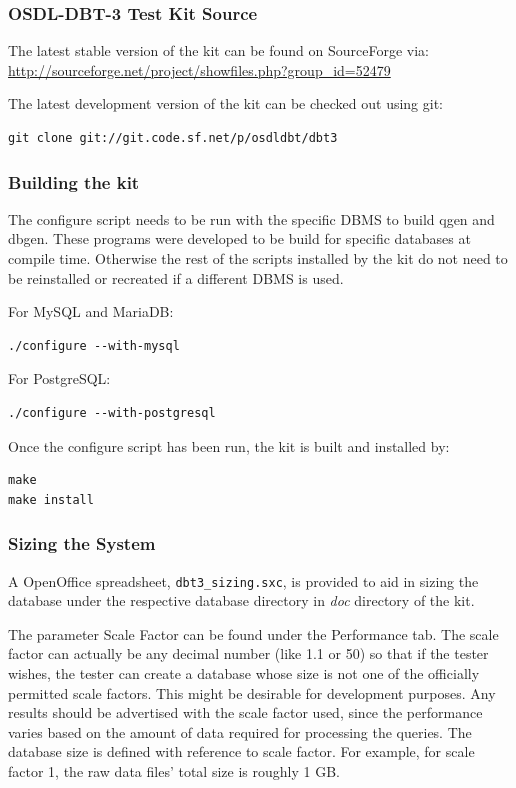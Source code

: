 \documentclass{article}
\begin{document}
\subsubsection{OSDL-DBT-3 Test Kit Source}

The latest stable version of the kit can be found on SourceForge
via: \url{http://sourceforge.net/project/showfiles.php?group\_id=52479}

The latest development version of the kit can be checked out using git:
\lstset{language=sh}
\begin{lstlisting}
git clone git://git.code.sf.net/p/osdldbt/dbt3
\end{lstlisting}

\subsubsection{Building the kit}

The configure script needs to be run with the specific DBMS to build qgen and dbgen.  These programs were developed to be build for specific databases at compile time.  Otherwise the rest of the scripts installed by the kit do not need to be reinstalled or recreated if a different DBMS is used.

For MySQL and MariaDB:
\lstset{language=sh}
\begin{lstlisting}
./configure --with-mysql
\end{lstlisting}

For PostgreSQL:
\lstset{language=sh}
\begin{lstlisting}
./configure --with-postgresql
\end{lstlisting}

Once the configure script has been run, the kit is built and installed by:
\begin{lstlisting}
make
make install
\end{lstlisting}

\subsubsection{Sizing the System}

A OpenOffice spreadsheet, \texttt{dbt3\_sizing.sxc}, is provided to aid in sizing the
database under the respective database directory in \textit{doc} directory of the kit.

The parameter Scale Factor can be found under the Performance tab.
The scale factor can actually be any decimal number (like 1.1 or 50)
so that if the tester wishes, the tester can create a database whose
size is not one of the officially permitted scale factors.  This
might be desirable for development purposes.  Any results should be
advertised with the scale factor used, since the performance varies
based on the amount of data required for processing the queries.  The
database size is defined with reference to scale factor.  For
example, for scale factor 1, the raw data files' total size is roughly 1 GB.
\end{document}

